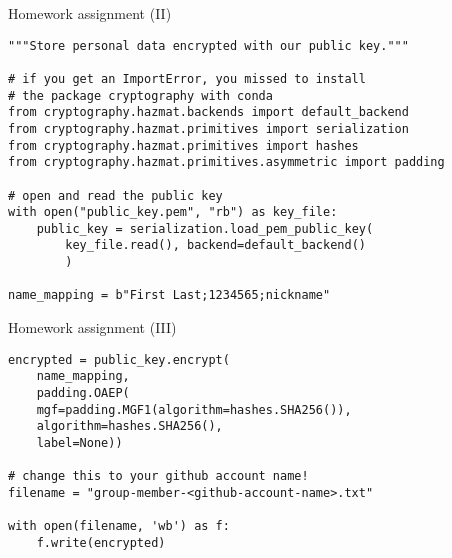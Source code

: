 \begin{frame}[fragile]{Homework assignment (II)}

	\begin{verbatim}
"""Store personal data encrypted with our public key."""

# if you get an ImportError, you missed to install
# the package cryptography with conda
from cryptography.hazmat.backends import default_backend
from cryptography.hazmat.primitives import serialization
from cryptography.hazmat.primitives import hashes
from cryptography.hazmat.primitives.asymmetric import padding

# open and read the public key
with open("public_key.pem", "rb") as key_file:
    public_key = serialization.load_pem_public_key(
        key_file.read(), backend=default_backend()
        )

name_mapping = b"First Last;1234565;nickname"
	\end{verbatim}

\end{frame}

\begin{frame}[fragile]{Homework assignment (III)}

	\begin{verbatim}
encrypted = public_key.encrypt(
    name_mapping,
    padding.OAEP(
    mgf=padding.MGF1(algorithm=hashes.SHA256()),
    algorithm=hashes.SHA256(),
    label=None))

# change this to your github account name!
filename = "group-member-<github-account-name>.txt"

with open(filename, 'wb') as f:
    f.write(encrypted)\end{verbatim}

	\end{frame}


